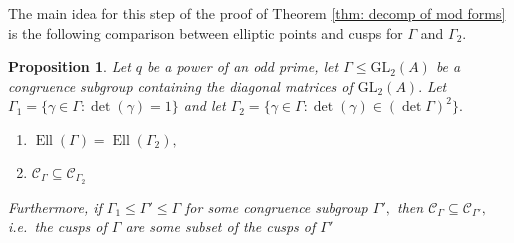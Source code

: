 \documentclass[11pt]{amsart}
\newtheorem{proposition}[theorem]{Proposition}
\theoremstyle{definition}
\numberwithin{equation}{section}
\newcommand{\GL}{\mathrm{GL}} 	%
\newcommand{\cC}{\mathcal{C}}		%
\begin{document}
		The main idea for this step of the proof of Theorem \ref{thm: decomp of mod forms} is the following comparison between elliptic points and cusps for $\Gamma$ and $\Gamma_2.$
		\begin{proposition}\label{p: elliptic points and cusps}
			Let $q$ be a power of an odd prime, let $\Gamma\leq \GL_2(A)$ be a congruence subgroup containing the diagonal matrices of $\GL_2(A).$ Let $\Gamma_1=\{\gamma\in \Gamma:\det(\gamma)=1\}$ and let $\Gamma_2=\{\gamma\in \Gamma:\det(\gamma)\in (\det\Gamma)^2\}.$
			\begin{enumerate}
				\item $\operatorname{Ell}(\Gamma)=\operatorname{Ell}(\Gamma_2),$
				\item $\cC_{\Gamma}\subseteq\cC_{\Gamma_2}$
			\end{enumerate}
			Furthermore, if $\Gamma_1\leq \Gamma'\leq\Gamma$ for some congruence subgroup $\Gamma',$ then $\cC_{\Gamma}\subseteq\cC_{\Gamma'},$ i.e.\ the cusps of $\Gamma$ are some subset of the cusps of $\Gamma'$
		\end{proposition}
\end{document}
